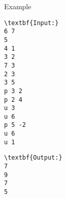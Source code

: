 Example
\begin{verbatim}
\textbf{Input:}
6 7 
5 
4 1 
3 2 
7 3 
2 3 
3 5 
p 3 2 
p 2 4 
u 3 
u 6 
p 5 -2 
u 6 
u 1
\end{verbatim}
\begin{verbatim}
\textbf{Output:}
7 
9
7
5\end{verbatim}